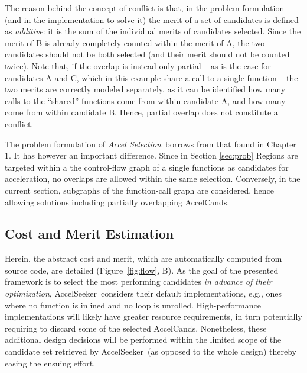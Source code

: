 \documentclass[]{usiinfthesis}
\newcommand{\aseeker}{{AccelSeeker}}
\newcommand{\candidates}{{AccelCand}s}
\newcommand{\asprobname}{\emph{Accel Selection}}
\begin{document}
The reason behind the concept of conflict is that, in the problem
formulation (and in the implementation to solve it) the merit of a set
of candidates is defined as \emph{additive}: it is the sum of the
individual merits of candidates selected. Since the merit of B is
already completely counted within the merit of A, the two candidates
should not be both selected (and their merit should not be counted
twice).
Note that, if the overlap is instead only partial -- as is the case for 
candidates A and C, which in this example share a call to a single function 
-- the two merits are correctly modeled separately, as it can be 
identified how many calls to the ``shared'' functions come from within candidate A, 
and how many come from within candidate B. Hence, partial overlap does not constitute 
a conflict.\par

The problem formulation of \asprobname\
borrows from that found in Chapter 1. It has however
an important difference. Since in Section \ref{sec:prob} Regions are targeted 
within a the control-flow graph of a single functions as
candidates for acceleration, no overlaps are allowed within the same
selection. Conversely, in the current section, subgraphs of the function-call
graph are considered, hence allowing solutions including partially overlapping
\candidates.




\subsection{Cost and Merit Estimation}
\label{sec:estimation}

Herein, the abstract cost and merit, which are automatically computed from 
source code, are detailed (Figure~\ref{fig:flow}, B). As the goal of the 
presented framework is to select the most performing candidates \emph{in 
advance of their optimization}, \aseeker\ considers their default implementations,
e.g., ones where no function is inlined and no loop is unrolled.
High-performance implementations will likely have greater resource
requirements, in turn potentially requiring to discard some of the
selected \candidates. Nonetheless, these additional design decisions will
be performed within the limited scope of the candidate set retrieved
by \aseeker\ (as opposed to the whole design) thereby easing the
ensuing effort.\par
\end{document}
